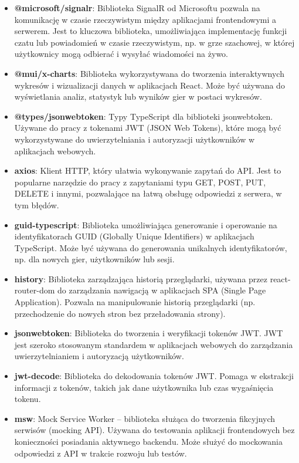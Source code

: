 \documentclass[12pt,a4paper]{article}
\begin{document}
\begin{itemize}
    \item \textbf{@microsoft/signalr}: Biblioteka SignalR od Microsoftu pozwala na komunikację w czasie rzeczywistym między aplikacjami frontendowymi a serwerem. Jest to kluczowa biblioteka, umożliwiająca implementację funkcji czatu lub powiadomień w czasie rzeczywistym, np. w grze szachowej, w której użytkownicy mogą odbierać i wysyłać wiadomości na żywo.
    \item \textbf{@mui/x-charts}: Biblioteka wykorzystywana do tworzenia interaktywnych wykresów i wizualizacji danych w aplikacjach React. Może być używana do wyświetlania analiz, statystyk lub wyników gier w postaci wykresów.
    \item \textbf{@types/jsonwebtoken}: Typy TypeScript dla biblioteki jsonwebtoken. Używane do pracy z tokenami JWT (JSON Web Tokens), które mogą być wykorzystywane do uwierzytelniania i autoryzacji użytkowników w aplikacjach webowych.
    \item \textbf{axios}: Klient HTTP, który ułatwia wykonywanie zapytań do API. Jest to popularne narzędzie do pracy z zapytaniami typu GET, POST, PUT, DELETE i innymi, pozwalające na łatwą obsługę odpowiedzi z serwera, w tym błędów.
    \item \textbf{guid-typescript}: Biblioteka umożliwiająca generowanie i operowanie na identyfikatorach GUID (Globally Unique Identifiers) w aplikacjach TypeScript. Może być używana do generowania unikalnych identyfikatorów, np. dla nowych gier, użytkowników lub sesji.
    \item \textbf{history}: Biblioteka zarządzająca historią przeglądarki, używana przez react-router-dom do zarządzania nawigacją w aplikacjach SPA (Single Page Application). Pozwala na manipulowanie historią przeglądarki (np. przechodzenie do nowych stron bez przeładowania strony).
    \item \textbf{jsonwebtoken}: Biblioteka do tworzenia i weryfikacji tokenów JWT. JWT jest szeroko stosowanym standardem w aplikacjach webowych do zarządzania uwierzytelnianiem i autoryzacją użytkowników.
    \item \textbf{jwt-decode}: Biblioteka do dekodowania tokenów JWT. Pomaga w ekstrakcji informacji z tokenów, takich jak dane użytkownika lub czas wygaśnięcia tokenu.
    \item \textbf{msw}: Mock Service Worker – biblioteka służąca do tworzenia fikcyjnych serwisów (mocking API). Używana do testowania aplikacji frontendowych bez konieczności posiadania aktywnego backendu. Może służyć do mockowania odpowiedzi z API w trakcie rozwoju lub testów.

\end{itemize}
\end{document}
